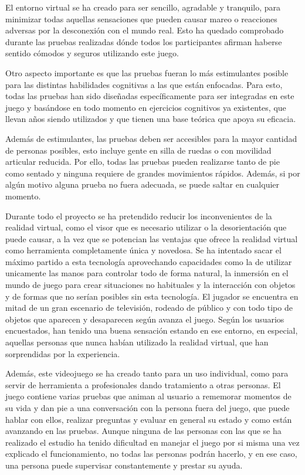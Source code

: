 El entorno virtual se ha creado para ser sencillo, agradable y tranquilo, para minimizar todas aquellas sensaciones que pueden causar mareo o reacciones adversas por la desconexión con el mundo real. Esto ha quedado comprobado durante las pruebas realizadas dónde todos los participantes afirman haberse sentido cómodos y seguros utilizando este juego.

Otro aspecto importante es que las pruebas fueran lo más estimulantes posible para las distintas habilidades cognitivas a las que están enfocadas. Para esto, todas las pruebas han sido diseñadas específicamente para ser integradas en este juego y basándose en todo momento en ejercicios cognitivos ya existentes, que llevan años siendo utilizados y que tienen una base teórica que apoya su eficacia.

Además de estimulantes, las pruebas deben ser accesibles para la mayor cantidad de personas posibles, esto incluye gente en silla de ruedas o con movilidad articular reducida. Por ello, todas las pruebas pueden realizarse tanto de pie como sentado y ninguna requiere de grandes movimientos rápidos. Además, si por algún motivo alguna prueba no fuera adecuada, se puede saltar en cualquier momento.

Durante todo el proyecto se ha pretendido reducir los inconvenientes de la realidad virtual, como el visor que es necesario utilizar o la desorientación que puede causar, a la vez que se potencian las ventajas que ofrece la realidad virtual como herramienta completamente única y novedosa. Se ha intentado sacar el máximo partido a esta tecnología aprovechando capacidades como la de utilizar unicamente las manos para controlar todo de forma natural, la inmersión en el mundo de juego para crear situaciones no habituales y la interacción con objetos y de formas que no serían posibles sin esta tecnología. El jugador se encuentra en mitad de un gran escenario de televisión, rodeado de público y con todo tipo de objetos que aparecen y desaparecen según avanza el juego. Según los usuarios encuestados, han tenido una buena sensación estando en ese entorno, en especial, aquellas personas que nunca habían utilizado la realidad virtual, que han sorprendidas por la experiencia.

Además, este videojuego se ha creado tanto para un uso individual, como para servir de herramienta a profesionales dando tratamiento a otras personas. El juego contiene varias pruebas que animan al usuario a rememorar momentos de su vida y dan pie a una conversación con la persona fuera del juego, que puede hablar con ellos, realizar preguntas y evaluar en general su estado y como están avanzando en las pruebas. Aunque ninguna de las personas con las que se ha realizado el estudio ha tenido dificultad en manejar el juego por si misma una vez explicado el funcionamiento, no todas las personas podrán hacerlo, y en ese caso, una persona puede supervisar constantemente y prestar su ayuda.




